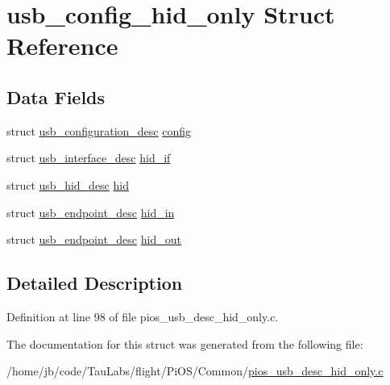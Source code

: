 \hypertarget{structusb__config__hid__only}{\section{usb\-\_\-config\-\_\-hid\-\_\-only \-Struct \-Reference}
\label{structusb__config__hid__only}
}
\subsection*{\-Data \-Fields}
\begin{DoxyCompactItemize}
\item 
struct \hyperlink{structusb__configuration__desc}{usb\-\_\-configuration\-\_\-desc} \hyperlink{group___p_i_o_s___u_s_b___d_e_s_c_gae5e25501e424468c229df0d1e09423a8}{config}
\item 
struct \hyperlink{structusb__interface__desc}{usb\-\_\-interface\-\_\-desc} \hyperlink{group___p_i_o_s___u_s_b___d_e_s_c_gab8d4a603dbaaacc357e4beb426cfd094}{hid\-\_\-if}
\item 
struct \hyperlink{structusb__hid__desc}{usb\-\_\-hid\-\_\-desc} \hyperlink{group___p_i_o_s___u_s_b___d_e_s_c_ga279cdc579474d229bf1bb7963f423423}{hid}
\item 
struct \hyperlink{structusb__endpoint__desc}{usb\-\_\-endpoint\-\_\-desc} \hyperlink{group___p_i_o_s___u_s_b___d_e_s_c_gac0401b402235f315c995eb13de1425ec}{hid\-\_\-in}
\item 
struct \hyperlink{structusb__endpoint__desc}{usb\-\_\-endpoint\-\_\-desc} \hyperlink{group___p_i_o_s___u_s_b___d_e_s_c_ga0bdaf8c80f7739bea621a6d5aa272641}{hid\-\_\-out}
\end{DoxyCompactItemize}


\subsection{\-Detailed \-Description}


\-Definition at line 98 of file pios\-\_\-usb\-\_\-desc\-\_\-hid\-\_\-only.\-c.



\-The documentation for this struct was generated from the following file\-:\begin{DoxyCompactItemize}
\item 
/home/jb/code/\-Tau\-Labs/flight/\-Pi\-O\-S/\-Common/\hyperlink{pios__usb__desc__hid__only_8c}{pios\-\_\-usb\-\_\-desc\-\_\-hid\-\_\-only.\-c}\end{DoxyCompactItemize}
